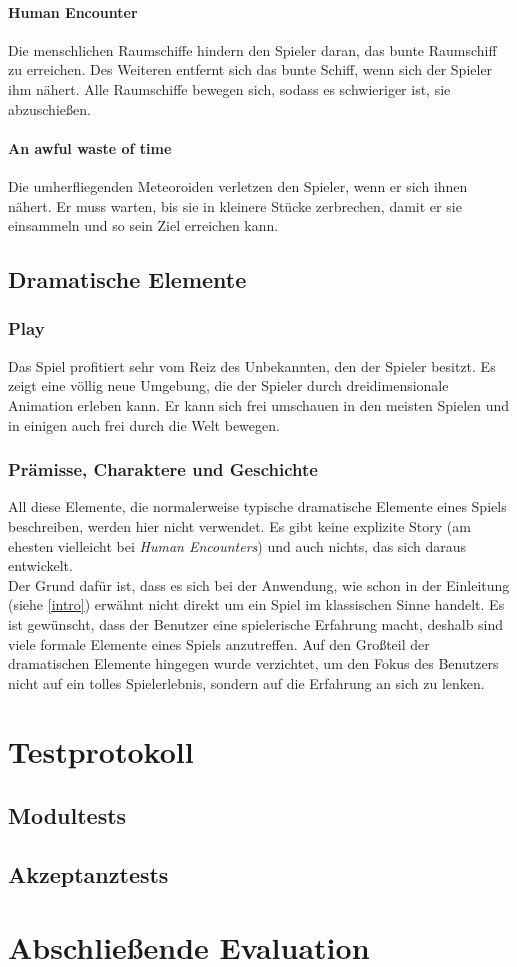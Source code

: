 \documentclass{Ausarbeitung}
\begin{document}
			\paragraph*{Human Encounter}
				Die menschlichen Raumschiffe hindern den Spieler daran, das bunte Raumschiff zu erreichen. Des Weiteren entfernt sich das bunte Schiff, wenn sich der Spieler ihm nähert. Alle Raumschiffe bewegen sich, sodass es schwieriger ist, sie abzuschießen.
				
			\paragraph*{An awful waste of time}
				Die umherfliegenden Meteoroiden verletzen den Spieler, wenn er sich ihnen nähert. Er muss warten, bis sie in kleinere Stücke zerbrechen, damit er sie einsammeln und so sein Ziel erreichen kann. 
				
	\subsection{Dramatische Elemente}
	\label{dramElemente}
		\subsubsection{Play}
			Das Spiel profitiert sehr vom Reiz des Unbekannten, den der Spieler besitzt. Es zeigt eine völlig neue Umgebung, die der Spieler durch dreidimensionale Animation erleben kann. Er kann sich frei umschauen in den meisten Spielen und in einigen auch frei durch die Welt bewegen. 
		\subsubsection{Prämisse, Charaktere und Geschichte}
			All diese Elemente, die normalerweise typische dramatische Elemente eines Spiels beschreiben, werden hier nicht verwendet. Es gibt keine explizite Story (am ehesten vielleicht bei \textit{Human Encounters}) und auch nichts, das sich daraus entwickelt. \\
			Der Grund dafür ist, dass es sich bei der Anwendung, wie schon in der Einleitung (siehe \ref{intro}) erwähnt nicht direkt um ein Spiel im klassischen Sinne handelt. Es ist gewünscht, dass der Benutzer eine spielerische Erfahrung macht, deshalb sind viele formale Elemente eines Spiels anzutreffen. Auf den Großteil der dramatischen Elemente hingegen wurde verzichtet, um den Fokus des Benutzers nicht auf ein tolles Spielerlebnis, sondern auf die Erfahrung an sich zu lenken.
\clearpage
\section{Testprotokoll}
\label{test}
	\subsection{Modultests}
	\label{modultest}
	\subsection{Akzeptanztests}
	\label{akzeptanztest}
\clearpage
\section{Abschließende Evaluation}
\label{Evaluation}


\vfill %
\printbibliography
\end{document}
